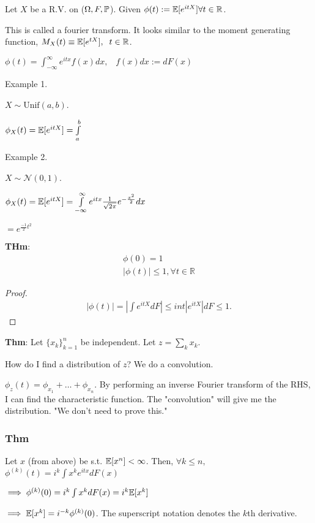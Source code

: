 Let $X$ be a R.V. on ($\Omega, F, \mathbb{P}$). Given $\phi(t) := \mathbb{E}[e^{itX}] \forall t\in \mathbb{R}$.

\begin{note}
This is called a fourier transform. It looks similar to the moment generating function,
$M_X(t) \equiv \mathbb{E}[e^{tX}], \;\; t\in\mathbb{R}$.
\end{note}


$\phi(t) = \int_{-\infty}^{\infty} e^{itx} f(x) dx, \;\;\; f(x)dx := dF(x)$

Example 1.

$X\sim \text{Unif}(a, b)$.

$\phi_X(t) = \mathbb{E}[e^{itX}] = \int\limits_a^b$


Example 2.

$X \sim \mathcal{N}(0, 1)$.

$\phi_X(t) = \mathbb{E}[e^{itX}] = \int\limits_{-\infty}^\infty e^{itx} \frac{1}{\sqrt{2\pi}} e^{-\frac{x^2}{2}} dx$

$= e^{\frac{-1}{2}t^2}$


\textbf{THm}:
\begin{gather}
\phi(0) = 1 \\
|\phi(t)| \leq 1, \forall t\in \mathbb{R}
\end{gather}
\begin{proof}
\[\begin{aligned}
|\phi(t)| = |\int e^{itX} dF| \leq int |e^{itX}| dF \leq 1.
\end{aligned}\]
\end{proof}


\textbf{Thm}: Let $\{ x_k\}_{k=1}^n$ be independent. Let $z = \sum_k x_k$.

How do I find a distribution of $z$? We do a convolution.

$\phi_z(t) = \phi_{x_1} + \ldots + \phi_{x_n}$.  By performing an inverse Fourier transform of the RHS, I can find the characteristic function. The "convolution" will give me the distribution. "We don't need to prove this."


\subsubsection*{Thm} Let $x$ (from above) be s.t. $\mathbb{E}[x^n] < \infty$. Then, $\forall k\leq n,$ $\phi^{(k)}(t) = i^k \int x^k e^{itx} dF(x)$

$\implies \phi^{(k)}(0) = i^k \int x^k dF(x)  = i^k \mathbb{E}[x^k]$

$\implies \mathbb{E}[x^k] = i^{-k} \phi^{(k)}(0)$. The superscript notation denotes the $k$th derivative.


